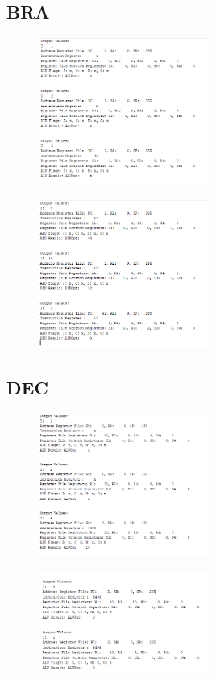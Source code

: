 \documentclass[pdftex,12pt,a4paper]{article}
\begin{document}
\subsection{BRA}
\begin{figure}[H]
	\centering
	\includegraphics[width=0.5\textwidth]{bra1.png}	
	\label{fig3}
\end{figure}
\begin{figure}[H]
	\centering
	\includegraphics[width=0.5\textwidth]{bra2.png}	
	\label{fig4}
\end{figure}

\subsection{DEC}
\begin{figure}[H]
	\centering
	\includegraphics[width=0.5\textwidth]{dec1.png}	
	\label{fig5}
\end{figure}
\begin{figure}[H]
	\centering
	\includegraphics[width=0.5\textwidth]{dec2.png}	
	\label{fig6}
\end{figure}
\end{document}
